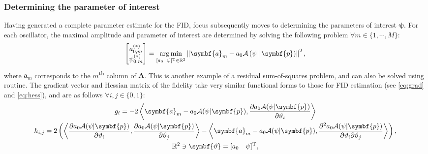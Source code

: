 \subsubsection{Determining the parameter of interest}
Having generated a complete parameter estimate for the \ac{FID}, focus
subsequently moves to determining the parameters of interest $\symbf{\psi}$.
For each oscillator, the maximal amplitude and parameter of
interest are determined by solving the following problem $\forall m \in \lbrace
1, \cdots, M \rbrace$:
\begin{equation}
    \begin{bmatrix}
        a_{0,m}^{(*)} \\
        \psi_{0,m}^{(*)}
    \end{bmatrix} =
    \argmin_{
        [a_0 \hspace*{5pt} \psi]\T \in \mathbb{R}^2
    }
    \left\lVert
        \symbf{a}_m - a_0 \mathcal{A} \left(\psi \hspace*{2pt} | \hspace*{2pt} \symbf{p}\right)
    \right\rVert^2,
\end{equation}
where $\symbf{a}_m$ corresponds to the $m$\textsuperscript{th} column of
$\symbf{A}$.
This is another example of a residual sum-of-squares problem, and can also be
solved using  routine. The gradient vector and Hessian
matrix of the fidelity take very similar functional forms to those for \ac{FID}
estimation (see \cref{eq:grad} and \cref{eq:hess}), and are as follows
$\forall i, j \in \lbrace 0, 1 \rbrace$:
\begin{subequations}
    \begin{gather}
        g_i =
            -2 \left \langle
                \symbf{a}_m - a_0 \mathcal{A}(\psi | \symbf{p}),
                \frac{\partial a_0 \mathcal{A} (\psi | \symbf{p})}
                {\partial \vartheta_i}
            \right \rangle\\
        h_{i,j} =
            2 \left( \left \langle
                \frac{\partial a_0 \mathcal{A} (\psi | \symbf{p})}{\partial \vartheta_i},
                \frac{\partial a_0 \mathcal{A} (\psi | \symbf{p})}{\partial \vartheta_j}
            \right \rangle -
            \left \langle
                \symbf{a}_m - a_0 \mathcal{A}(\psi | \symbf{p}),
                \frac{\partial^2 a_0 \mathcal{A} (\psi | \symbf{p})}{\partial
                \vartheta_i\partial \vartheta_j}
            \right \rangle \right), \\
            \mathbb{R}^2 \ni \symbf{\vartheta} = [a_0 \hspace*{10pt} \psi]\T,
    \end{gather}
\end{subequations}
